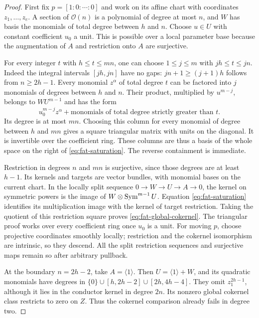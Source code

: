 \begin{proof}
First fix $p=[1:0:\cdots:0]$ and work on its affine chart with
coordinates $z_1,\ldots,z_e$. A section of $\mathcal O(n)$ is a
polynomial of degree at most $n$, and $W$ has basis the monomials
of total degree between $h$ and $n$. Choose $u\in U$ with constant
coefficient $u_0$ a unit. This is possible over a local parameter
base because the augmentation of $A$ and restriction onto $A$ are
surjective.

For every integer $t$ with $h\le t\le mn$, one can choose
$1\le j\le m$ with $jh\le t\le jn$. Indeed the integral intervals
$[jh,jn]$ have no gaps: $jn+1\ge(j+1)h$ follows from $n\ge2h-1$.
Every monomial $z^\alpha$ of total degree $t$ can be factored into
$j$ monomials of degrees between $h$ and $n$. Their product,
multiplied by $u^{m-j}$, belongs to $WU^{m-1}$ and has the form
\[
 u_0^{m-j}z^\alpha+
             \text{monomials of total degree strictly greater than }t.
\]
Its degree is at most $mn$. Choosing this column for every monomial
of degree between $h$ and $mn$ gives a square triangular matrix
with units on the diagonal. It is invertible over the coefficient
ring. These columns are thus a basis of the whole space on the
right of \eqref{eq:fat-saturation}. The reverse containment is immediate.

Restriction in degrees $n$ and $mn$ is surjective, since those
degrees are at least $h-1$. Its kernels and targets are vector
bundles, with monomial bases on the current chart. In the locally
split sequence $0\to W\to U\to A\to0$, the kernel on symmetric
powers is the image of $W\otimes\operatorname{Sym}^{m-1}U$. Equation
\eqref{eq:fat-saturation} identifies its multiplication image with
the kernel of target restriction. Taking the quotient of this
restriction square proves \eqref{eq:fat-global-cokernel}.
The triangular proof works over every coefficient ring once $u_0$
is a unit. For moving $p$, choose projective coordinates smoothly
locally; restriction and the cokernel isomorphism are intrinsic, so
they descend. All the split restriction sequences and surjective
maps remain so after arbitrary pullback.

At the boundary $n=2h-2$, take $A=\langle1\rangle$. Then
$U=\langle1\rangle+W$, and its quadratic monomials have degrees in
$\{0\}\cup[h,2h-2]\cup[2h,4h-4]$. They omit $z_1^{2h-1}$,
although it lies in the conductor kernel in degree $2n$.
Its nonzero global cokernel class restricts to zero on $Z$.
Thus the cokernel comparison already fails in degree two.
\end{proof}

